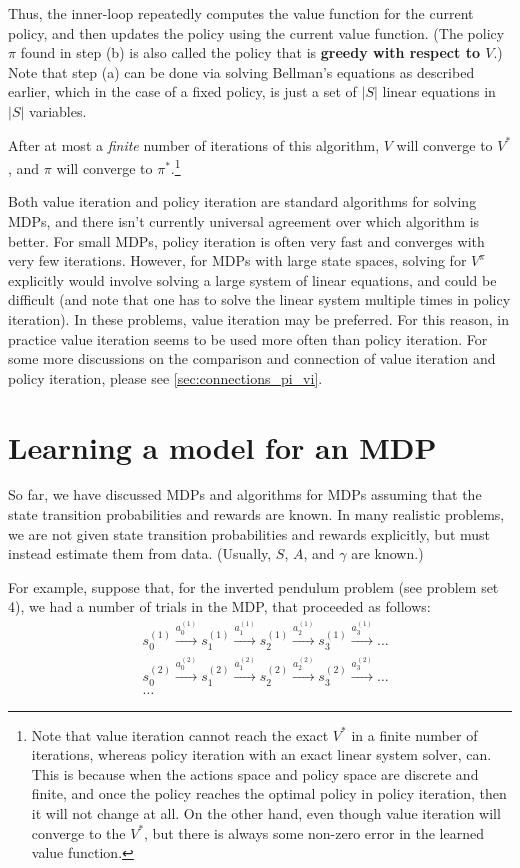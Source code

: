 Thus, the inner-loop repeatedly computes the value function for the
current policy, and then updates the policy using the current value function.
(The policy $\pi$ found in step (b) is also called the policy that is \textbf{greedy with
respect to $V$}.) Note that step (a) can be done via solving Bellman's
equations as described earlier, which in the case of a fixed policy, is just a set of
$|S|$ linear equations in $|S|$ variables.

After at most a \textit{finite} number of iterations of this algorithm, $V$ will
converge to $V^*$, and $\pi$ will converge to $\pi^*$.\footnote{
Note that value iteration cannot reach the exact $V^*$ in a finite number of iterations,
whereas policy iteration with an exact linear system solver, can. This is because when
the actions space and policy space are discrete and finite, and once the policy reaches the
optimal policy in policy iteration, then it will not change at all. On the other hand, even
though value iteration will converge to the $V^*$, but there is always some non-zero error in
the learned value function.}

Both value iteration and policy iteration are standard algorithms for
solving MDPs, and there isn't currently universal agreement over which
algorithm is better. For small MDPs, policy iteration is often very fast and %
converges with very few iterations. However, for MDPs with large state spaces,
solving for $V^\pi$ explicitly would involve solving a large system of linear
equations, and could be difficult (and note that one has to solve the linear system
multiple times in policy iteration). In these problems, value iteration may be
preferred. For this reason, in practice value iteration seems to be used more
often than policy iteration. For some more discussions on the comparison
and connection of value iteration and policy iteration, please see \cref{sec:connections_pi_vi}.

\chapter{Learning a model for an MDP}
So far, we have discussed MDPs and algorithms for MDPs assuming that the
state transition probabilities and rewards are known. In many realistic
problems, we are not given state transition probabilities and rewards explicitly,
but must instead estimate them from data. (Usually, $S$, $A$, and $\gamma$ are known.) %

For example, suppose that, for the inverted pendulum problem (see
problem set 4), we had a number of trials in the MDP, that proceeded as follows:
\begin{align*}
    &s_0^{(1)} \overset{a_0^{(1)}}{\longrightarrow} s_1^{(1)} \overset{a_1^{(1)}}{\longrightarrow} s_2^{(1)} \overset{a_2^{(1)}}{\longrightarrow} s_3^{(1)} \overset{a_3^{(1)}}{\longrightarrow} \ldots\\
    &s_0^{(2)} \overset{a_0^{(2)}}{\longrightarrow} s_1^{(2)} \overset{a_1^{(2)}}{\longrightarrow} s_2^{(2)} \overset{a_2^{(2)}}{\longrightarrow} s_3^{(2)} \overset{a_3^{(2)}}{\longrightarrow} \ldots\\
    &\ldots
\end{align*}

